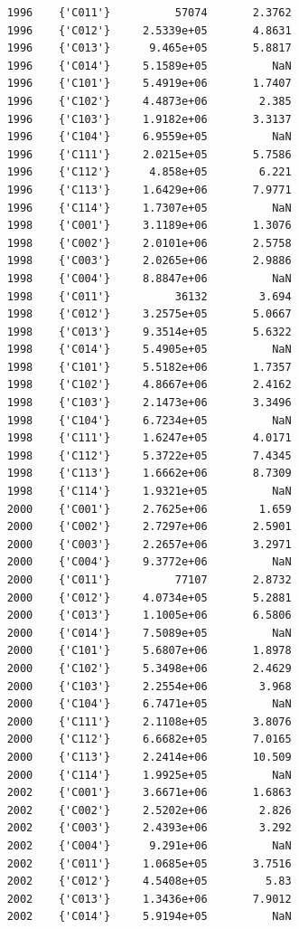 \documentclass[
]{book}
\begin{document}
\begin{verbatim}
    1996    {'C011'}          57074       2.3762 
    1996    {'C012'}     2.5339e+05       4.8631 
    1996    {'C013'}      9.465e+05       5.8817 
    1996    {'C014'}     5.1589e+05          NaN 
    1996    {'C101'}     5.4919e+06       1.7407 
    1996    {'C102'}     4.4873e+06        2.385 
    1996    {'C103'}     1.9182e+06       3.3137 
    1996    {'C104'}     6.9559e+05          NaN 
    1996    {'C111'}     2.0215e+05       5.7586 
    1996    {'C112'}      4.858e+05        6.221 
    1996    {'C113'}     1.6429e+06       7.9771 
    1996    {'C114'}     1.7307e+05          NaN 
    1998    {'C001'}     3.1189e+06       1.3076 
    1998    {'C002'}     2.0101e+06       2.5758 
    1998    {'C003'}     2.0265e+06       2.9886 
    1998    {'C004'}     8.8847e+06          NaN 
    1998    {'C011'}          36132        3.694 
    1998    {'C012'}     3.2575e+05       5.0667 
    1998    {'C013'}     9.3514e+05       5.6322 
    1998    {'C014'}     5.4905e+05          NaN 
    1998    {'C101'}     5.5182e+06       1.7357 
    1998    {'C102'}     4.8667e+06       2.4162 
    1998    {'C103'}     2.1473e+06       3.3496 
    1998    {'C104'}     6.7234e+05          NaN 
    1998    {'C111'}     1.6247e+05       4.0171 
    1998    {'C112'}     5.3722e+05       7.4345 
    1998    {'C113'}     1.6662e+06       8.7309 
    1998    {'C114'}     1.9321e+05          NaN 
    2000    {'C001'}     2.7625e+06        1.659 
    2000    {'C002'}     2.7297e+06       2.5901 
    2000    {'C003'}     2.2657e+06       3.2971 
    2000    {'C004'}     9.3772e+06          NaN 
    2000    {'C011'}          77107       2.8732 
    2000    {'C012'}     4.0734e+05       5.2881 
    2000    {'C013'}     1.1005e+06       6.5806 
    2000    {'C014'}     7.5089e+05          NaN 
    2000    {'C101'}     5.6807e+06       1.8978 
    2000    {'C102'}     5.3498e+06       2.4629 
    2000    {'C103'}     2.2554e+06        3.968 
    2000    {'C104'}     6.7471e+05          NaN 
    2000    {'C111'}     2.1108e+05       3.8076 
    2000    {'C112'}     6.6682e+05       7.0165 
    2000    {'C113'}     2.2414e+06       10.509 
    2000    {'C114'}     1.9925e+05          NaN 
    2002    {'C001'}     3.6671e+06       1.6863 
    2002    {'C002'}     2.5202e+06        2.826 
    2002    {'C003'}     2.4393e+06        3.292 
    2002    {'C004'}      9.291e+06          NaN 
    2002    {'C011'}     1.0685e+05       3.7516 
    2002    {'C012'}     4.5408e+05         5.83 
    2002    {'C013'}     1.3436e+06       7.9012 
    2002    {'C014'}     5.9194e+05          NaN 

\end{verbatim}
\end{document}

